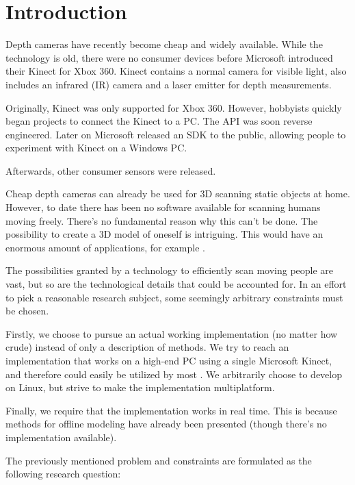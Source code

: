 \chapter{Introduction}

 Depth cameras have recently become cheap and widely available. While the technology is old, there were no consumer devices before Microsoft introduced their Kinect for Xbox 360. Kinect contains a normal camera for visible light,  also includes an infrared (IR) camera and a laser emitter for depth measurements. 


Originally, Kinect was only supported for Xbox 360. However, hobbyists quickly began projects to connect the Kinect to a PC. The API was soon reverse engineered. Later on Microsoft released an SDK to the public, allowing people to experiment with Kinect on a Windows PC.

Afterwards, other consumer sensors were released. 

Cheap depth cameras can already be used for 3D scanning static objects at home. However, to date there has been no software available for scanning humans moving freely. There's no fundamental reason why this can't be done. The possibility to create a 3D model of oneself is intriguing. This would have an enormous amount of applications, for example .


The possibilities granted by a technology to efficiently scan moving people are vast, but so are the technological details that could be accounted for. In an effort to pick a reasonable research subject, some seemingly arbitrary constraints must be chosen.

Firstly, we choose to pursue an actual working implementation (no matter how crude) instead of only a description of methods. We try to reach an implementation that works on a high-end PC using a single Microsoft Kinect, and therefore could easily be utilized by most . We arbitrarily choose to develop on Linux, but strive to make the implementation multiplatform.

Finally, we require that the implementation works in real time. This is because methods for offline modeling have already been presented (though there's no implementation available).

The previously mentioned problem and constraints are formulated as the following research question:

